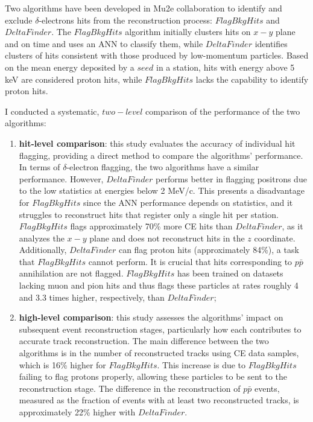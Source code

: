 Two algorithms have been developed in Mu2e collaboration to identify 
and exclude $\delta$-electrons hits from the reconstruction 
process: $FlagBkgHits$ and $DeltaFinder$. 
The $FlagBkgHits$ algorithm initially clusters hits on $x-y$ plane 
and on time and uses an ANN to classify them, 
while $DeltaFinder$ identifies clusters of hits consistent with those 
produced by 
low-momentum particles. Based on the mean energy deposited by a $seed$ 
in a station, hits with energy above 5 keV are considered 
proton hits, while $FlagBkgHits$ lacks the 
capability to identify proton hits.

I conducted a systematic, $two-level$ comparison of the performance 
of the two algorithms:
\begin{enumerate}
    \item \textbf{hit-level comparison}: this study evaluates the accuracy 
    of individual hit flagging, providing a direct method to compare 
    the algorithms' performance. In terms of $\delta$-electron flagging, 
    the two algorithms have a similar performance. However, 
    $DeltaFinder$ performs 
    better in flagging positrons due to the low statistics at energies 
    below 2 MeV/c. This presents a disadvantage for $FlagBkgHits$ since 
    the ANN performance depends on statistics, and it struggles 
    to reconstruct hits 
    that register only a single hit per station. $FlagBkgHits$ flags 
    approximately 70\% more CE hits than $DeltaFinder$, as it analyzes 
    the $x-y$ plane and does not reconstruct hits in the $z$ coordinate. 
    Additionally, $DeltaFinder$ 
    can flag proton hits (approximately 84\%), a task that $FlagBkgHits$ 
    cannot perform. 
    It is crucial that hits corresponding to $p\bar{p}$ annihilation 
    are not flagged. $FlagBkgHits$ has been trained on datasets lacking 
    muon and pion hits and thus flags these particles at rates roughly 
    4 and 3.3 times higher, respectively, than $DeltaFinder$;

\item  \textbf{high-level comparison}: this study 
assesses the algorithms' impact on 
subsequent event reconstruction stages, 
particularly how each contributes to accurate 
track reconstruction. The main difference 
between the two algorithms is in the number 
of reconstructed tracks using CE data samples, 
which is 16\% higher for $FlagBkgHits$. 
This increase is due to $FlagBkgHits$ failing to 
flag protons properly, allowing these 
particles to be sent to the reconstruction stage. 
The difference in the reconstruction of $p\bar{p}$ 
events, measured as the fraction of events with at 
least two reconstructed tracks, is approximately 
22\% higher with $DeltaFinder$.
\end{enumerate}

